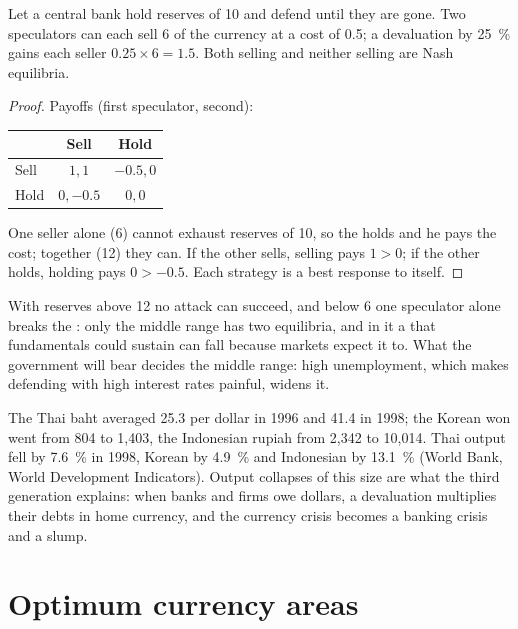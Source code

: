 \begin{proposition}\label{prop:b3:exchange-rate-regimes:multiple}
Let a central bank hold reserves of 10 and defend until they are gone. Two
speculators can each sell 6 of the currency at a cost of 0.5; a devaluation by 25~\%
gains each seller $0.25 \times 6 = 1.5$. Both selling and neither selling are Nash
equilibria.
\end{proposition}

\begin{proof}
Payoffs (first speculator, second):
\begin{center}\small
\begin{tabular}{lcc}
 & Sell & Hold \\ \hline
Sell & $1, 1$ & $-0.5, 0$ \\
Hold & $0, -0.5$ & $0, 0$ \\ \hline
\end{tabular}
\end{center}
One seller alone (6) cannot exhaust reserves of 10, so the  holds and he pays
the cost; together (12) they can. If the other sells, selling pays $1 > 0$; if the
other holds, holding pays $0 > -0.5$. Each strategy is a best response to itself.
\end{proof}

With reserves above 12 no attack can succeed, and below 6 one speculator alone
breaks the : only the middle range has two equilibria, and in it a  that
fundamentals could sustain can fall because markets expect it to. What the
government will bear decides the middle range: high unemployment, which makes
defending with high interest rates painful, widens it. %

\begin{record}
The Thai baht averaged 25.3 per dollar in 1996 and 41.4 in 1998; the Korean won
went from 804 to 1{,}403, the Indonesian rupiah from 2{,}342 to 10{,}014. Thai output fell
by 7.6~\% in 1998, Korean by 4.9~\% and Indonesian by 13.1~\% (World Bank, World
Development Indicators). Output collapses of this size are what the third
generation explains: when banks and firms owe dollars, a devaluation multiplies
their debts in home currency, and the currency crisis becomes a banking crisis
and a slump.
\end{record}

\section{Optimum currency areas}\label{sec:b3:exchange-rate-regimes:oca}

